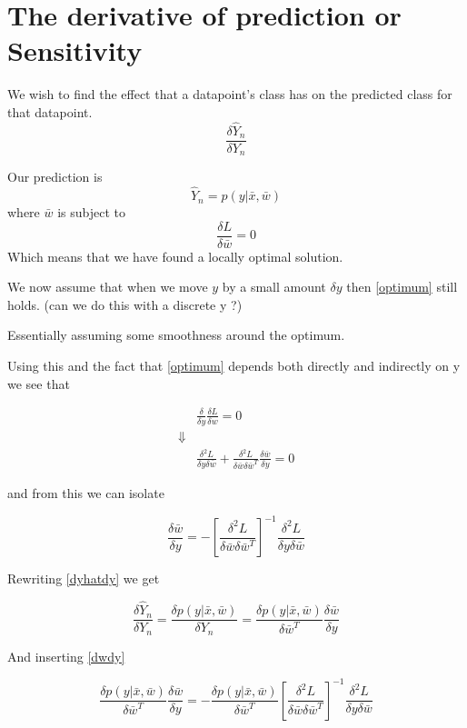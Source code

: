 
\section{The derivative of prediction or Sensitivity}
We wish to find the effect that a datapoint's class has on the predicted class for that datapoint.
\begin{equation}
\label{dyhatdy}
\frac{\delta \hat{Y}_n}{\delta Y_n}
\end{equation}

Our prediction is 
\begin{equation}
 \hat{Y}_n = p(y|\bar{x},\bar{w})
\end{equation}
where $\bar{w}$ is subject to 
\begin{equation}
\label{optimum}
\frac{\delta L}{\delta\bar{w}}=0
\end{equation}
Which means that we have found a locally optimal solution.

We now assume that when we move $y$ by a small amount $\delta y$ then \ref{optimum} still holds. (can we do this with a discrete y ?)

Essentially assuming some smoothness around the optimum.

Using this and the fact that \ref{optimum} depends both directly and indirectly on y we see that

\begin{eqnarray*}
&\frac{\delta}{\delta y} \frac{\delta L}{\delta w} = 0\\
\Downarrow & \\
&\frac{\delta^2 L}{\delta y \delta \bar{w}} + \frac{\delta^2 L}{\delta \bar{w} \delta \bar{w}^T} \frac{\delta \bar{w}}{\delta y}= 0
\end{eqnarray*}

and from this we can isolate

\begin{equation}
\label{dwdy}
\frac{\delta \bar{w}}{\delta y} = - \left[ \frac{\delta^2 L}{\delta \bar{w} \delta \bar{w}^T} \right]^{-1} \frac{\delta^2 L}{\delta y \delta \bar{w}} 
\end{equation}

Rewriting \ref{dyhatdy} we get

\begin{equation}
\frac{\delta \hat{Y}_n}{\delta Y_n} = \frac{\delta p(y|\bar{x},\bar{w})}{\delta Y_n} =  \frac{\delta p(y|\bar{x},\bar{w})}{\delta \bar{w}^T} \frac{\delta \bar{w}}{\delta y}
\end{equation}

And inserting \ref{dwdy} 

\begin{equation}
\frac{\delta p(y|\bar{x},\bar{w})}{\delta \bar{w}^T} \frac{\delta \bar{w}}{\delta y} = - \frac{\delta p(y|\bar{x},\bar{w})}{\delta \bar{w}^T} \left[ \frac{\delta^2 L}{\delta \bar{w} \delta \bar{w}^T} \right]^{-1} \frac{\delta^2 L}{\delta y \delta \bar{w}}
\end{equation}

